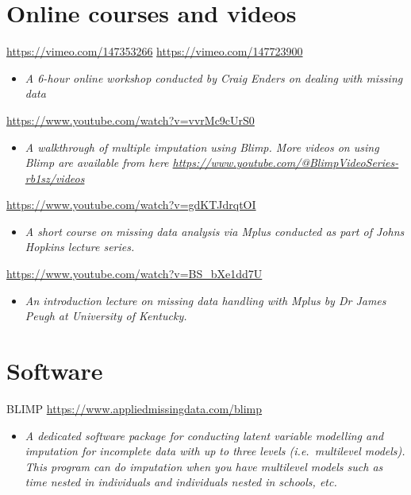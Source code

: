\documentclass[
]{book}
\providecommand{\tightlist}{%
  \setlength{\itemsep}{0pt}\setlength{\parskip}{0pt}}
\begin{document}
\hypertarget{online-courses-and-videos-4}{%
\section{Online courses and videos}\label{online-courses-and-videos-4}}

\url{https://vimeo.com/147353266}
\url{https://vimeo.com/147723900}

\begin{itemize}
\tightlist
\item
  \emph{A 6-hour online workshop conducted by Craig Enders on dealing with missing data}
\end{itemize}

\url{https://www.youtube.com/watch?v=vvrMc9cUrS0}

\begin{itemize}
\tightlist
\item
  \emph{A walkthrough of multiple imputation using Blimp. More videos on using Blimp are available from here \url{https://www.youtube.com/@BlimpVideoSeries-rb1sz/videos} }
\end{itemize}

\url{https://www.youtube.com/watch?v=gdKTJdrqtOI}

\begin{itemize}
\tightlist
\item
  \emph{A short course on missing data analysis via Mplus conducted as part of Johns Hopkins lecture series. }
\end{itemize}

\url{https://www.youtube.com/watch?v=BS_bXe1dd7U}

\begin{itemize}
\tightlist
\item
  \emph{An introduction lecture on missing data handling with Mplus by Dr James Peugh at University of Kentucky.}
\end{itemize}

\hypertarget{software-1}{%
\section{Software}\label{software-1}}

BLIMP \url{https://www.appliedmissingdata.com/blimp}

\begin{itemize}
\tightlist
\item
  \emph{A dedicated software package for conducting latent variable modelling and imputation for incomplete data with up to three levels (i.e.~multilevel models). This program can do imputation when you have multilevel models such as time nested in individuals and individuals nested in schools, etc. }
\end{itemize}

  
\end{document}
